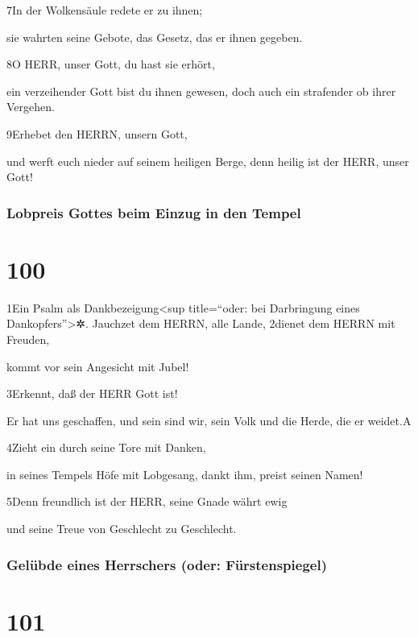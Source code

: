 7In der Wolkensäule redete er zu ihnen;

sie wahrten seine Gebote, das Gesetz, das er ihnen gegeben.

8O HERR, unser Gott, du hast sie erhört,

ein verzeihender Gott bist du ihnen gewesen, doch auch ein strafender ob
ihrer Vergehen.

9Erhebet den HERRN, unsern Gott,

und werft euch nieder auf seinem heiligen Berge, denn heilig ist der
HERR, unser Gott!

\hypertarget{lobpreis-gottes-beim-einzug-in-den-tempel}{%
\subsubsection{Lobpreis Gottes beim Einzug in den
Tempel}\label{lobpreis-gottes-beim-einzug-in-den-tempel}}

\hypertarget{section-99}{%
\section{100}\label{section-99}}

1Ein Psalm als Dankbezeigung\textless sup title=``oder: bei Darbringung
eines Dankopfers''\textgreater✲. Jauchzet dem HERRN, alle Lande, 2dienet
dem HERRN mit Freuden,

kommt vor sein Angesicht mit Jubel!

3Erkennt, daß der HERR Gott ist!

Er hat uns geschaffen, und sein sind wir, sein Volk und die Herde, die
er weidet.{A}

4Zieht ein durch seine Tore mit Danken,

in seines Tempels Höfe mit Lobgesang, dankt ihm, preist seinen Namen!

5Denn freundlich ist der HERR, seine Gnade währt ewig

und seine Treue von Geschlecht zu Geschlecht.

\hypertarget{geluxfcbde-eines-herrschers-oder-fuxfcrstenspiegel}{%
\subsubsection{Gelübde eines Herrschers (oder:
Fürstenspiegel)}\label{geluxfcbde-eines-herrschers-oder-fuxfcrstenspiegel}}

\hypertarget{section-100}{%
\section{101}\label{section-100}}

